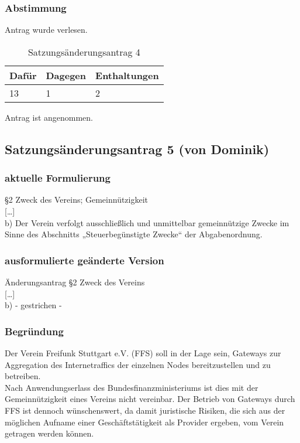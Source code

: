\documentclass[a4paper]{scrartcl}
\begin{document}
\subsubsection{Abstimmung}

Antrag wurde verlesen.

\begin{table}[h]
	\begin{tabularx}{\textwidth}{XXX}
		Dafür & Dagegen & Enthaltungen\\
		\toprule
		13 & 1 & 2\\
	\end{tabularx}
	\caption{Satzungsänderungsantrag 4}
\end{table}
Antrag ist angenommen.

\subsection{Satzungsänderungsantrag 5 (von Dominik)}
\subsubsection{aktuelle Formulierung}

§2 Zweck des Vereins; Gemeinnützigkeit\\
{[}\dots{]}\\
b) Der Verein verfolgt ausschließlich und unmittelbar gemeinnützige
Zwecke im Sinne des Abschnitts „Steuerbegünstigte Zwecke“ der Abgabenordnung.

\subsubsection{ausformulierte geänderte Version}

Änderungsantrag
§2 Zweck des Vereins\\
{[}\dots{]}\\
b) - gestrichen -

\subsubsection{Begründung}

Der Verein Freifunk Stuttgart e.V. (FFS) soll in der Lage sein, Gateways zur Aggregation des Internetraffics der einzelnen Nodes bereitzustellen
und zu betreiben.\\
Nach Anwendungserlass des Bundesfinanzministeriums ist dies mit der Gemeinnützigkeit eines Vereins nicht vereinbar. Der Betrieb von Gateways durch FFS ist dennoch wünschenswert, da damit juristische Risiken, die sich aus der möglichen Aufname einer Geschäftstätigkeit als Provider ergeben, vom Verein getragen werden können.
\end{document}
